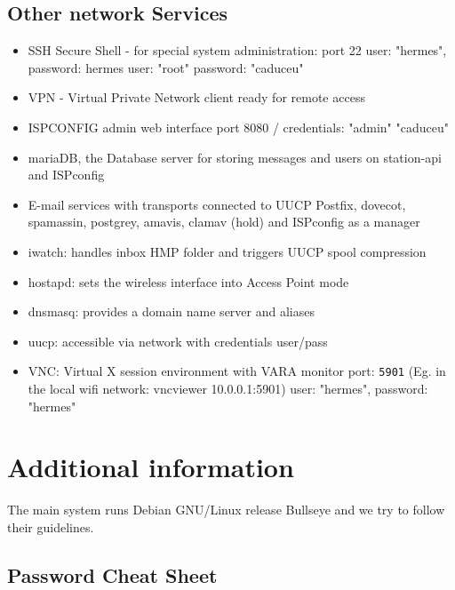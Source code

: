 \documentclass[11pt,a4paper]{article}
\begin{document}
\subsection{Other network Services }
\label{apx_other_net}


\begin{itemize}
    \item SSH Secure Shell - for special system administration: port 22\newline
        \hfill user: "hermes", password: hermes\newline
        \hfill user: "root" password: "caduceu"
    \item VPN -  Virtual Private Network client ready for remote access
    \item ISPCONFIG admin web interface\newline
        \hfill port 8080 / credentials: "admin" "caduceu"
    \item mariaDB, the Database server for storing messages and users on station-api and ISPconfig
    \item E-mail services with transports connected to UUCP\newline
        \hfill Postfix, dovecot, spamassin, postgrey, amavis, clamav (hold) and ISPconfig as a manager 
    \item iwatch: handles inbox HMP folder and triggers UUCP spool compression
    \item hostapd: sets the wireless interface into Access Point mode
    \item dnsmasq: provides a domain name server and aliases 
    \item uucp: accessible via network with credentials user/pass%
    \item VNC: Virtual X session environment with VARA monitor
        \hfill port: \texttt{5901} (Eg. in the local wifi network: vncviewer 10.0.0.1:5901) 
        \hfill user: "hermes", password: "hermes"
\end{itemize}

\section{Additional information}
\label{apx_adit_info}
    The main system runs Debian GNU/Linux release Bullseye and we try to follow their guidelines.

\subsection{Password Cheat Sheet}
\label{passwords}
\end{document}
